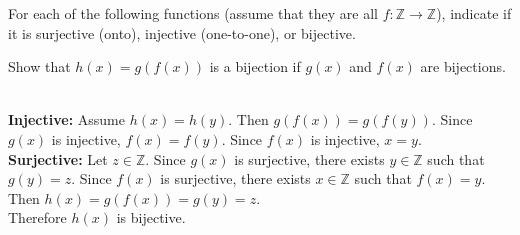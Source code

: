 \documentclass[solutionorbox,answers]{exam}
\begin{document}
\begin{questions}

\question
For each of the following functions (assume that they are all $f: \mathbb{Z} \to \mathbb{Z}$), indicate if it is surjective (onto), injective (one-to-one), or bijective.

\question
Show that $h(x) = g(f(x))$ is a bijection if $g(x)$ and $f(x)$ are bijections.

\begin{solutionbox}{3in} \\
  \textbf{Injective:} Assume $h(x) = h(y)$. Then $g(f(x)) = g(f(y))$. Since $g(x)$ is injective, $f(x) = f(y)$. Since $f(x)$ is injective, $x = y$. \\
  \textbf{Surjective:} Let $z \in \mathbb{Z}$. Since $g(x)$ is surjective, there exists $y \in \mathbb{Z}$ such that $g(y) = z$. Since $f(x)$ is surjective, there exists $x \in \mathbb{Z}$ such that $f(x) = y$. Then $h(x) = g(f(x)) = g(y) = z$. \\
  Therefore $h(x)$ is bijective.

\end{solutionbox}


\end{questions}
\end{document}
